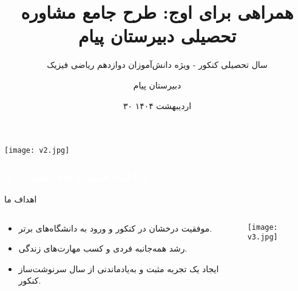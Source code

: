 \documentclass[aspectratio=169]{beamer}
\title{همراهی برای اوج: طرح جامع مشاوره تحصیلی دبیرستان پیام}
\subtitle{سال تحصیلی کنکور - ویژه دانش‌آموزان دوازدهم ریاضی فیزیک}
\author{دبیرستان پیام} %
\institute{مشاوره تحصیلی دبیرستان پیام}
\date{۳۰ اردیبهشت ۱۴۰۴} %
\begin{document}
\begin{frame}[plain] %
  \titlepage

  \vfill %
  \begin{center}
    \texttt{[image: v2.jpg]} %
  \end{center}
  \vfill %
\end{frame}

\begin{frame}
  \frametitle{\textcolor{white}{\textbf{چرا اینجا هستیم؟ هدف مشترک ما}}}

  \begin{block}{اهداف ما}
    \begin{columns}[T]
      \begin{column}{0.6\textwidth}
        \begin{itemize}
          \item موفقیت درخشان در کنکور و ورود به دانشگاه‌های برتر.
          \item رشد همه‌جانبه فردی و کسب مهارت‌های زندگی.
          \item ایجاد یک تجربه مثبت و به‌یادماندنی از سال سرنوشت‌ساز کنکور.
        \end{itemize}
      \end{column}

      \begin{column}{0.35\textwidth}
        \centering
        \texttt{[image: v3.jpg]}
      \end{column}
    \end{columns}
  \end{block}
\end{frame}
\end{document}
